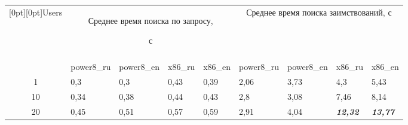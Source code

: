   \begin{table}\small %

  \begin{center}


  \vspace*{2ex}

  

 \tabcolsep=3pt

  \begin{tabular}{|c|l|l|l|l|l|l|l|l|}

  \hline

\multicolumn{1}{|c|}{\raisebox{-6pt}[0pt][0pt]{Users}} &\multicolumn{4}{c|}{Среднее время поиска по запросу, 

с}&\multicolumn{4}{c|}{Среднее время поиска заимствований, с}\\

     \cline{2-9}

     &&&&&&&\\[-9pt]

&power8\_ru&power8\_en&x86\_ru&x86\_en&power8\_ru&power8\_en&x86\_ru&x86\_en\\

     \hline

\hphantom{9}1&\hspace*{3mm}0,3&\hspace*{3mm}0,3&\hspace*{2mm}0,43&\hspace*{2mm}0,39&\hspace*{1.5mm}\hphantom{9}2,06&\hspace*{1.5mm}\hphantom{9}3,73&\hphantom{9}4,3\hphantom{9}&\hphantom{9}5,43\\

10&\hspace*{3mm}0,34&\hspace*{3mm}0,38&\hspace*{2mm}0,44&\hspace*{2mm}0,43&\hspace*{1.5mm}\hphantom{9}2,8\hphantom{9}&\hspace*{1.5mm}\hphantom{9}3,08&\hphantom{9}7,46&\hphantom{9}8,14\\

20&\hspace*{3mm}0,45&\hspace*{3mm}0,51&\hspace*{2mm}0,57&\hspace*{2mm}0,59&\hspace*{1.5mm}\hphantom{9}2,91&\hspace*{1.5mm}\hphantom{9}4,04&{\bfseries\textit{12,32}}&{\bfseries\textit{13,77}}\\


\end{tabular}
\end{center}
\end{table}
